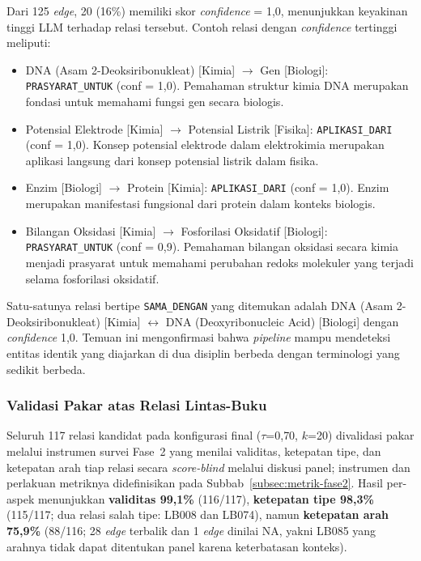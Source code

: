 \documentclass[../../thesis]{subfiles}
\begin{document}
Dari 125 \textit{edge}, 20 (16\%) memiliki skor \textit{confidence} = 1{,}0, menunjukkan
keyakinan tinggi LLM terhadap relasi tersebut. Contoh relasi dengan
\textit{confidence} tertinggi meliputi:

\begin{itemize}
  \item DNA (Asam 2-Deoksiribonukleat) [Kimia] $\to$ Gen [Biologi]:
    \texttt{PRASYARAT\_UNTUK} (conf = 1{,}0). Pemahaman struktur kimia DNA merupakan
    fondasi untuk memahami fungsi gen secara biologis.
  \item Potensial Elektrode [Kimia] $\to$ Potensial Listrik [Fisika]:
    \texttt{APLIKASI\_DARI} (conf = 1{,}0). Konsep potensial elektrode dalam
    elektrokimia merupakan aplikasi langsung dari konsep potensial listrik
    dalam fisika.
  \item Enzim [Biologi] $\to$ Protein [Kimia]: \texttt{APLIKASI\_DARI} (conf = 1{,}0).
    Enzim merupakan manifestasi fungsional dari protein dalam konteks biologis.
  \item Bilangan Oksidasi [Kimia] $\to$ Fosforilasi Oksidatif [Biologi]:
    \texttt{PRASYARAT\_UNTUK} (conf = 0{,}9). Pemahaman bilangan oksidasi secara
    kimia menjadi prasyarat untuk memahami perubahan redoks molekuler yang
    terjadi selama fosforilasi oksidatif.
\end{itemize}

Satu-satunya relasi bertipe \texttt{SAMA\_DENGAN} yang ditemukan adalah DNA (Asam
2-Deoksiribonukleat) [Kimia] $\leftrightarrow$ DNA (Deoxyribonucleic Acid)
[Biologi] dengan \textit{confidence} 1{,}0. Temuan ini mengonfirmasi bahwa
\textit{pipeline} mampu mendeteksi entitas identik yang diajarkan di dua disiplin
berbeda dengan terminologi yang sedikit berbeda.

\subsubsection{Validasi Pakar atas Relasi Lintas-Buku}

Seluruh 117 relasi kandidat pada konfigurasi final ($\tau$=0{,}70, $k$=20)
divalidasi pakar melalui instrumen survei Fase~2 yang menilai validitas,
ketepatan tipe, dan ketepatan arah tiap relasi secara \textit{score-blind}
melalui diskusi panel; instrumen dan perlakuan metriknya didefinisikan pada
Subbab~\ref{subsec:metrik-fase2}. Hasil per-aspek menunjukkan
\textbf{validitas 99{,}1\%} (116/117), \textbf{ketepatan tipe 98{,}3\%}
(115/117; dua relasi salah tipe: LB008 dan LB074), namun \textbf{ketepatan
arah 75{,}9\%} (88/116; 28 \textit{edge} terbalik dan 1 \textit{edge} dinilai
NA, yakni LB085 yang arahnya tidak dapat ditentukan panel karena keterbatasan
konteks).
\end{document}
